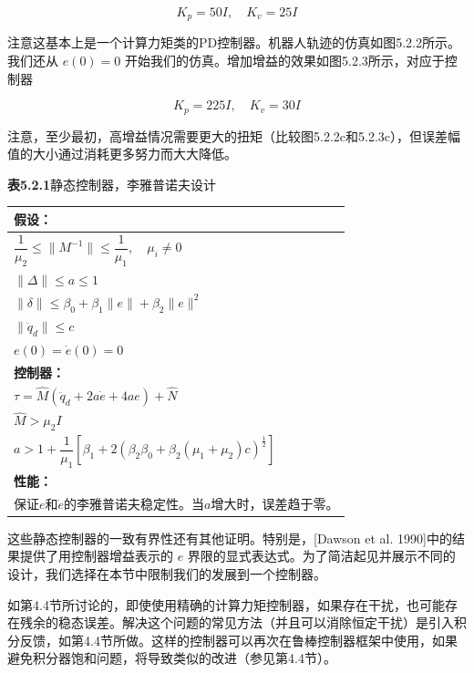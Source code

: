 \documentclass[UTF8,12pt,a4paper]{ctexart}
\begin{document}
\begin{example}
\begin{equation*}
K_p = 50I, \quad K_v = 25I
\end{equation*}

注意这基本上是一个计算力矩类的PD控制器。机器人轨迹的仿真如图5.2.2所示。我们还从 $e(0) = 0$ 开始我们的仿真。增加增益的效果如图5.2.3所示，对应于控制器

\begin{equation*}
K_p = 225I, \quad K_v = 30I
\end{equation*}

注意，至少最初，高增益情况需要更大的扭矩（比较图5.2.2c和5.2.3c），但误差幅值的大小通过消耗更多努力而大大降低。
\end{example}

\textbf{表5.2.1}\quad 静态控制器，李雅普诺夫设计

\begin{center}
\begin{tabular}{|l|l|}
\hline
\multicolumn{2}{|l|}{\textbf{假设：}} \\
\hline
$\dfrac{1}{\mu_2} \leq \|M^{-1}\| \leq \dfrac{1}{\mu_1}, \quad \mu_i \neq 0$ & \\
$\|\Delta\| \leq a \leq 1$ & \\
$\|\delta\| \leq \beta_0 + \beta_1\|e\| + \beta_2\|e\|^2$ & \\
$\|\ddot{q}_d\| \leq c$ & \\
$e(0) = \dot{e}(0) = 0$ & \\
\hline
\multicolumn{2}{|l|}{\textbf{控制器：}} \\
\hline
$\tau = \hat{M}(\ddot{q}_d + 2a\dot{e} + 4ae) + \hat{N}$ & \\
$\hat{M} > \mu_2 I$ & \\
$a > 1 + \dfrac{1}{\mu_1}\left[\beta_1 + 2(\beta_2\beta_0 + \beta_2(\mu_1 + \mu_2)c)^{\frac{1}{2}}\right]$ & \\
\hline
\multicolumn{2}{|l|}{\textbf{性能：}} \\
\hline
\multicolumn{2}{|p{10cm}|}{保证$e$和$\dot{e}$的李雅普诺夫稳定性。当$a$增大时，误差趋于零。} \\
\hline
\end{tabular}
\end{center}

这些静态控制器的一致有界性还有其他证明。特别是，[Dawson et al. 1990]中的结果提供了用控制器增益表示的 $e$ 界限的显式表达式。为了简洁起见并展示不同的设计，我们选择在本节中限制我们的发展到一个控制器。

如第4.4节所讨论的，即使使用精确的计算力矩控制器，如果存在干扰，也可能存在残余的稳态误差。解决这个问题的常见方法（并且可以消除恒定干扰）是引入积分反馈，如第4.4节所做。这样的控制器可以再次在鲁棒控制器框架中使用，如果避免积分器饱和问题，将导致类似的改进（参见第4.4节）。
\end{document}
